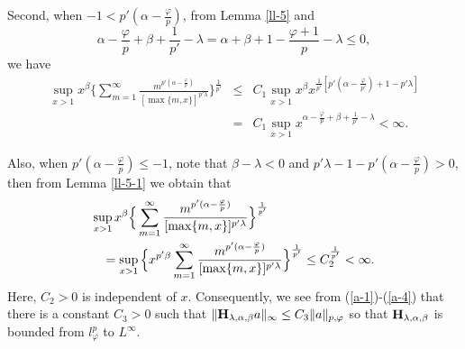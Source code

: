\documentclass[10pt]{amsart}
\theoremstyle{definition}    %
\numberwithin{equation}{section}
\begin{document}
Second, when $-1<p'(\alpha-\frac{\varphi}{p})$, from Lemma \ref{ll-5} and 
$$\alpha-\frac{\varphi}{p}+\beta+\frac{1}{p'}-\lambda=\alpha+\beta+1-\frac{\varphi+1}{p}-\lambda\leq 0,$$ we have
\begin{eqnarray}\label{a-3}
\sup_{x>1}x^{\beta}\Big\{\sum_{m=1}^{\infty}\frac{m^{p'(\alpha-\frac{\varphi}{p})}}{[\max\{m,x\}]^{p'\lambda}}\Big\}^{\frac{1}{p'}}&\leq& C_1\sup_{x>1}x^{\beta}x^{\frac{1}{p'}[p'(\alpha-\frac{\varphi}{p'})+1-p'\lambda]}
  \\
&=&C_1\sup_{x>1}x^{\alpha-\frac{\varphi}{p}+\beta+\frac{1}{p'}-\lambda}<\infty.\nonumber
\end{eqnarray}

Also, when $p'(\alpha-\frac{\varphi}{p})\leq -1$, note that $\beta-\lambda<0$ and $p'\lambda-1-p'(\alpha-\frac{\varphi}{p})>0$, then from Lemma \ref{ll-5-1} we obtain that
 \begin{eqnarray}\label{a-4}
\lefteqn{\sup_{x>1}x^{\beta}\Big\{\sum_{m=1}^{\infty}\frac{m^{p'(\alpha-\frac{\varphi}{p})}}{[\max\{m,x\}]^{p'\lambda}}\Big\}^{\frac{1}{p'}}}
\nonumber \\
&&=\sup_{x>1}\Big\{x^{p'\beta}\sum_{m=1}^{\infty}\frac{m^{p'(\alpha-\frac{\varphi}{p})}}{[\max\{m,x\}]^{p'\lambda}}\Big\}^{\frac{1}{p'}}
\leq C_2^{\frac{1}{p'}}<\infty. 
\end{eqnarray}
Here, $C_2>0$ is independent of $x$. Consequently, we see from (\ref{a-1})-(\ref{a-4}) that there is a constant $C_3>0$ such that $\|{\bf H}_{\lambda, \alpha, \beta}a\|_{\infty}\leq C_3 \|a\|_{p, \varphi}$ so that ${\bf H}_{\lambda, \alpha, \beta}$ is bounded from $l_{\varphi}^{p}$ to $L^{\infty}$. 
\end{document}
